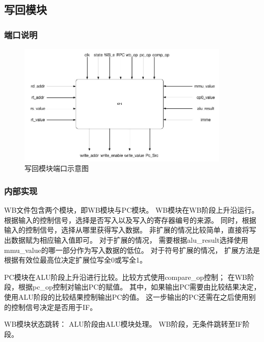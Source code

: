     \subsection{写回模块}
        \subsubsection{端口说明}
            
            \begin{figure}[!hbp]
                \centering
                \caption{写回模块端口示意图}
                \includegraphics[width=0.9\textwidth]{chart/wb.jpg}
            \end{figure}
        \subsubsection{内部实现}
            WB文件包含两个模块，即WB模块与PC模块。%
            WB模块在WB阶段上升沿运行。%
            根据输入的控制信号，选择是否写入以及写入的寄存器编号的来源。%
            同时，根据输入的控制信号，选择从哪里获得写入数据。%
            非扩展的情况比较简单，直接将写出数据赋为相应输入值即可。%
            对于扩展的情况，%
            需要根据alu\_result选择使用mmu\_value的哪一部分作为写入数据的低位。
            对于符号扩展的情况，%
            扩展方法是根据有效位最高位决定扩展位写全0或写全1。
            
            PC模块在ALU阶段上升沿进行比较。比较方式使用compare\_op控制；%
            在WB阶段，根据pc\_op控制对输出PC的赋值。%
            其中，如果输出PC需要由比较结果决定，%
            使用ALU阶段的比较结果控制输出PC的值。%
            这一步输出的PC还需在之后使用别的控制信号决定是否用于IF。

            WB模块状态跳转：%
	        ALU阶段由ALU模块处理。%
	        WB阶段，无条件跳转至IF阶段。

